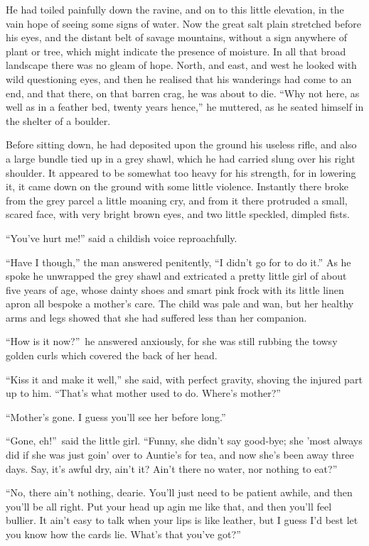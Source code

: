 \documentclass[12pt,english]{book}
\begin{document}
He had toiled painfully down the ravine, and on to this little elevation,
in the vain hope of seeing some signs of water. Now the great salt
plain stretched before his eyes, and the distant belt of savage mountains,
without a sign anywhere of plant or tree, which might indicate the
presence of moisture. In all that broad landscape there was no gleam
of hope. North, and east, and west he looked with wild questioning
eyes, and then he realised that his wanderings had come to an end,
and that there, on that barren crag, he was about to die. {}``Why
not here, as well as in a feather bed, twenty years hence,'' he muttered,
as he seated himself in the shelter of a boulder.

Before sitting down, he had deposited upon the ground his useless
rifle, and also a large bundle tied up in a grey shawl, which he had
carried slung over his right shoulder. It appeared to be somewhat
too heavy for his strength, for in lowering it, it came down on the
ground with some little violence. Instantly there broke from the grey
parcel a little moaning cry, and from it there protruded a small,
scared face, with very bright brown eyes, and two little speckled,
dimpled fists.

{}``You've hurt me!'' said a childish voice reproachfully.

{}``Have I though,'' the man answered penitently, {}``I didn't
go for to do it.'' As he spoke he unwrapped the grey shawl and extricated
a pretty little girl of about five years of age, whose dainty shoes
and smart pink frock with its little linen apron all bespoke a mother's
care. The child was pale and wan, but her healthy arms and legs showed
that she had suffered less than her companion.

{}``How is it now?''\ he answered anxiously, for she was still
rubbing the towsy golden curls which covered the back of her head.

{}``Kiss it and make it well,'' she said, with perfect gravity,
shoving the injured part up to him. {}``That's what mother used to
do. Where's mother?''

{}``Mother's gone. I guess you'll see her before long.''

{}``Gone, eh!''\ said the little girl. {}``Funny, she didn't say
good-bye; she 'most always did if she was just goin' over to Auntie's
for tea, and now she's been away three days. Say, it's awful dry,
ain't it? Ain't there no water, nor nothing to eat?''

{}``No, there ain't nothing, dearie. You'll just need to be patient
awhile, and then you'll be all right. Put your head up agin me like
that, and then you'll feel bullier. It ain't easy to talk when your
lips is like leather, but I guess I'd best let you know how the cards
lie. What's that you've got?''
\end{document}
